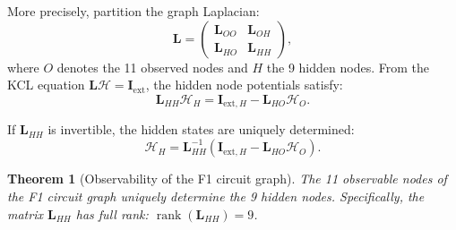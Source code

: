 \documentclass[twocolumn,10pt,a4paper]{article}
\newtheorem{theorem}{Theorem}[section]
\theoremstyle{definition}
\theoremstyle{remark}
\newcommand{\Hcal}{\mathcal{H}}
\newcommand{\vect}[1]{\boldsymbol{#1}}
\newcommand{\mat}[1]{\mathbf{#1}}
\DeclareMathOperator{\rank}{rank}
\begin{document}
More precisely, partition the graph Laplacian:
\begin{equation}\label{eq:laplacian_partition}
    \mat{L} = \begin{pmatrix} \mat{L}_{OO} & \mat{L}_{OH} \\ \mat{L}_{HO} & \mat{L}_{HH} \end{pmatrix},
\end{equation}
where $O$ denotes the 11 observed nodes and $H$ the 9 hidden nodes. From the KCL equation $\mat{L}\vect{\Hcal} = \vect{I}_{\mathrm{ext}}$, the hidden node potentials satisfy:
\begin{equation}\label{eq:hidden_from_observed}
    \mat{L}_{HH} \vect{\Hcal}_H = \vect{I}_{\mathrm{ext},H} - \mat{L}_{HO} \vect{\Hcal}_O.
\end{equation}

If $\mat{L}_{HH}$ is invertible, the hidden states are uniquely determined:
\begin{equation}\label{eq:hidden_solution}
    \vect{\Hcal}_H = \mat{L}_{HH}^{-1} (\vect{I}_{\mathrm{ext},H} - \mat{L}_{HO} \vect{\Hcal}_O).
\end{equation}

\begin{theorem}[Observability of the F1 circuit graph]\label{thm:observability}
The 11 observable nodes of the F1 circuit graph uniquely determine the 9 hidden nodes. Specifically, the matrix $\mat{L}_{HH}$ has full rank: $\rank(\mat{L}_{HH}) = 9$.
\end{theorem}
\end{document}
